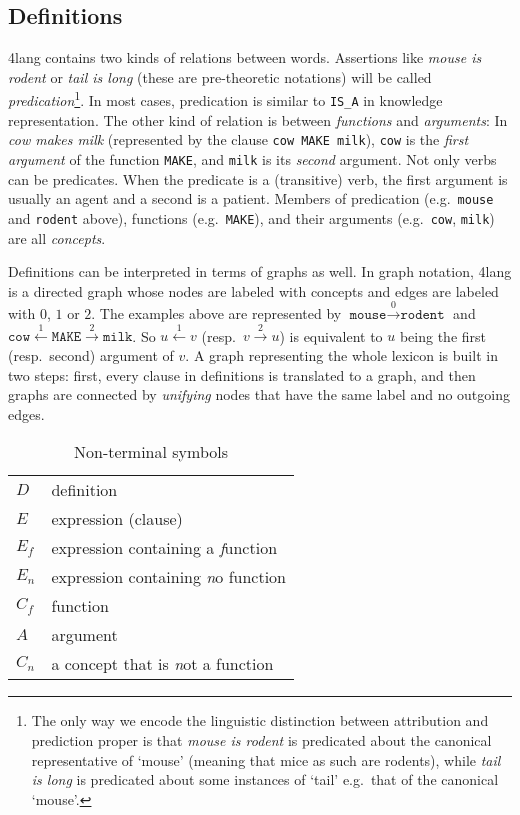 \documentclass[a4paper,10pt]{article}
\begin{document}
\subsection{Definitions}
4lang contains two kinds of relations between words. Assertions like \emph{mouse is rodent} or \emph{tail is long} (these are pre-theoretic notations) will be called \emph{predication}\footnote{The only way we encode the linguistic distinction between attribution and prediction proper is that \emph{mouse is rodent} is predicated about the canonical representative of `mouse' (meaning that mice as such are rodents), while \emph{tail is long} is predicated about some instances of `tail' e.g.\ that of the canonical `mouse'.}. In most cases, predication is similar to \texttt{IS\_A} in knowledge representation. The other kind of relation is between \emph{functions} and \emph{arguments}: In \emph{cow makes milk} (represented by the clause \texttt{cow MAKE milk}), \texttt{cow} is the \emph{first argument} of the function \texttt{MAKE}, and \texttt{milk} is its \emph{second} argument. Not only verbs can be predicates. When the predicate is a (transitive) verb, the first argument is usually an agent and a second is a patient. Members of predication (e.g.\ \texttt{mouse} and \texttt{rodent} above), functions (e.g.\ \texttt{MAKE}), and their arguments (e.g.\ \texttt{cow}, \texttt{milk}) are all \emph{concepts}.

Definitions can be interpreted in terms of graphs as well. In graph notation, 4lang is a directed graph whose nodes are labeled with concepts and edges are labeled with $0$, $1$ or $2$. The examples above are represented by $\texttt{mouse}\xrightarrow{0}\texttt{rodent}$ and $\texttt{cow}\xleftarrow{1}\texttt{MAKE}\xrightarrow{2}\texttt{milk}$. So $u\xleftarrow{1}v$ (resp.\ $v\xrightarrow 2 u$) is equivalent to $u$ being the first (resp.\ second) argument of $v$.
A graph representing the whole lexicon is built in two steps: first, every clause in definitions is translated to a graph, and then graphs are connected by \emph{unifying} nodes that have the same label and no outgoing edges.


\begin{table}[h]
\begin{center}
\begin{tabular}{ll}
 $D$ & definition
\\ $ E $ & expression (clause)
\\ $ E_f $ & expression containing a \emph function
\\ $ E_n  $ & expression containing \emph no function
\\ $ C_f $ & function
\\ $ A $ & argument 
\\ $ C_n $ & a concept that is \emph not a function
\end{tabular}
\end{center}
\caption{Non-terminal symbols}
\label{table_nont}
\end{table}
\end{document}
